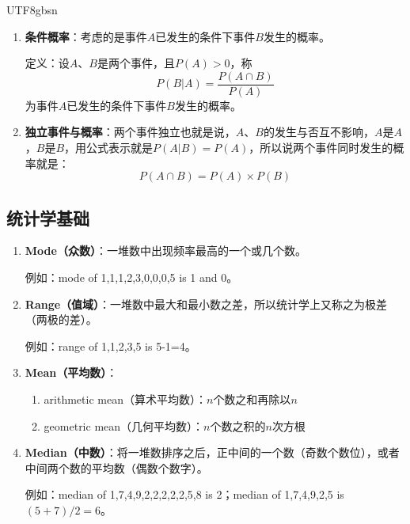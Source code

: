 \documentclass[12pt]{article}
\begin{document}
\begin{CJK*}{UTF8}{gbsn}
\begin{enumerate}
\begin{enumerate}
        例如：$a$：一件事不发生，$b$：一件事发生，则$A$、$B$是对立事件。
        
        显然：$P(\text{一件事发生的概率或一件事不发生的概率}) = 1$（必然事件的概率为1），则一件事发生的概率$= 1 - $一件事不发生的概率。
        
        \item \textbf{条件概率}：考虑的是事件$A$已发生的条件下事件$B$发生的概率。
        
        定义：设$A$、$B$是两个事件，且$P(A) > 0$，称
        $$P(B|A) = \frac{P(A \cap B)}{P(A)}$$
        为事件$A$已发生的条件下事件$B$发生的概率。
        
                 \item \textbf{独立事件与概率}：两个事件独立也就是说，$A$、$B$的发生与否互不影响，$A$是$A$，$B$是$B$，用公式表示就是$P(A|B) = P(A)$，所以说两个事件同时发生的概率就是：
        $$P(A \cap B) = P(A) \times P(B)$$
    \end{enumerate}
\end{enumerate}

\subsection{统计学基础}
\begin{enumerate}
    \item \textbf{Mode（众数）}：一堆数中出现频率最高的一个或几个数。
    
    例如：mode of 1,1,1,2,3,0,0,0,5 is 1 and 0。
    
    \item \textbf{Range（值域）}：一堆数中最大和最小数之差，所以统计学上又称之为极差（两极的差）。
    
    例如：range of 1,1,2,3,5 is 5-1=4。
    
    \item \textbf{Mean（平均数）}：
    \begin{enumerate}
        \item arithmetic mean（算术平均数）：$n$个数之和再除以$n$
        \item geometric mean（几何平均数）：$n$个数之积的$n$次方根
    \end{enumerate}
    
    \item \textbf{Median（中数）}：将一堆数排序之后，正中间的一个数（奇数个数位），或者中间两个数的平均数（偶数个数字）。
    
    例如：median of 1,7,4,9,2,2,2,2,2,5,8 is 2；median of 1,7,4,9,2,5 is $(5+7)/2=6$。
    

\end{enumerate}
\end{CJK*}
\end{document}
